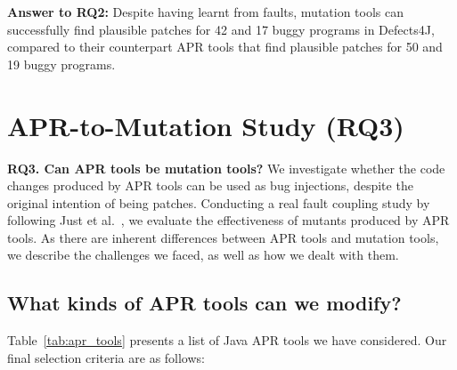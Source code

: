 \documentclass[conference]{IEEEtran}
\def\d4j{Defects4J\xspace}
\newcommand\inv[1]{#1\raisebox{1.15ex}{$\scriptscriptstyle-\!1$}}
\begin{document}


\begin{tcolorbox}[boxrule=0pt,frame hidden,sharp corners,enhanced,borderline north={1pt}{0pt}{black},borderline south={1pt}{0pt}{black},boxsep=2pt,left=2pt,right=2pt,top=2.5pt,bottom=2pt]
\textbf{Answer to RQ2:} Despite having learnt from faults, mutation tools can
successfully find plausible patches for 42 and 17 buggy programs in \d4j, 
compared to their counterpart APR tools that find plausible patches for 50 and 19
buggy programs.

\end{tcolorbox}



\section{APR-to-Mutation Study (RQ3)}
\label{sec:RQ3}


\textbf{RQ3. Can APR tools be mutation tools?} We investigate whether the code
changes produced by APR tools can be used as bug injections, despite the
original intention of being patches. Conducting a real fault coupling study
by following Just et al.~\cite{just2014mutants}, we evaluate the effectiveness of
mutants produced by APR tools. As there are inherent differences between APR
tools and mutation tools, we describe the challenges we faced, as well as how we
dealt with them.



\subsection{What kinds of APR tools can we modify?}

Table~\ref{tab:apr_tools} presents a list of Java APR tools we have considered.
Our final selection criteria are as follows:
\end{document}
